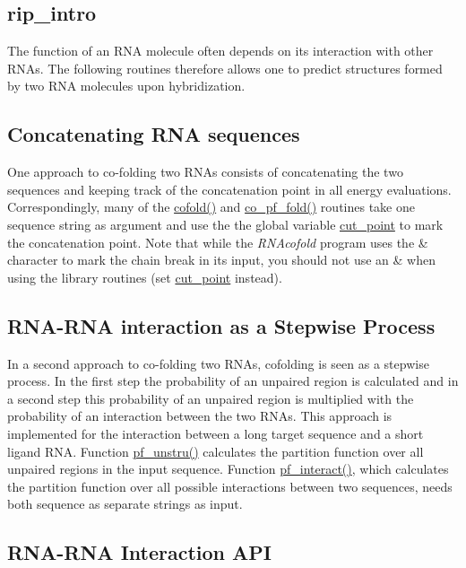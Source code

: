\hypertarget{rip_rip_intro}{}\subsection{rip\+\_\+intro}\label{rip_rip_intro}
The function of an R\+NA molecule often depends on its interaction with other R\+N\+As. The following routines therefore allows one to predict structures formed by two R\+NA molecules upon hybridization.\hypertarget{rip_rip_concat}{}\subsection{Concatenating R\+N\+A sequences}\label{rip_rip_concat}
One approach to co-\/folding two R\+N\+As consists of concatenating the two sequences and keeping track of the concatenation point in all energy evaluations. Correspondingly, many of the \mbox{\hyperlink{group__mfe__global__deprecated_gabc8517f22cfe70595ee81fc837910d52}{cofold()}} and \mbox{\hyperlink{group__part__func__global__deprecated_gae5c1e7331718669bdae7a86de2be6184}{co\+\_\+pf\+\_\+fold()}} routines take one sequence string as argument and use the the global variable \mbox{\hyperlink{fold__vars_8h_ab9b2c3a37a5516614c06d0ab54b97cda}{cut\+\_\+point}} to mark the concatenation point. Note that while the {\itshape R\+N\+Acofold} program uses the \textquotesingle{}\&\textquotesingle{} character to mark the chain break in its input, you should not use an \textquotesingle{}\&\textquotesingle{} when using the library routines (set \mbox{\hyperlink{fold__vars_8h_ab9b2c3a37a5516614c06d0ab54b97cda}{cut\+\_\+point}} instead).\hypertarget{rip_rip_stepwise}{}\subsection{R\+N\+A-\/\+R\+N\+A interaction as a Stepwise Process}\label{rip_rip_stepwise}
In a second approach to co-\/folding two R\+N\+As, cofolding is seen as a stepwise process. In the first step the probability of an unpaired region is calculated and in a second step this probability of an unpaired region is multiplied with the probability of an interaction between the two R\+N\+As. This approach is implemented for the interaction between a long target sequence and a short ligand R\+NA. Function \mbox{\hyperlink{group__up__cofold_ga5b4ee40e190d2f633cd01cf0d2fe93cf}{pf\+\_\+unstru()}} calculates the partition function over all unpaired regions in the input sequence. Function \mbox{\hyperlink{group__up__cofold_ga1aa0aa02bc3a724f87360c03097afd00}{pf\+\_\+interact()}}, which calculates the partition function over all possible interactions between two sequences, needs both sequence as separate strings as input.\hypertarget{rip_rip_api}{}\subsection{R\+N\+A-\/\+R\+N\+A Interaction A\+PI}\label{rip_rip_api}
